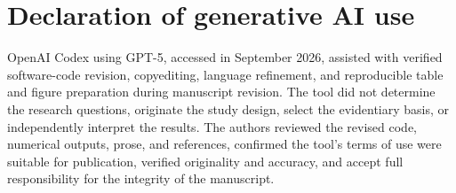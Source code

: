 \documentclass[]{interact}
\begin{document}
\section*{Declaration of generative AI use}

OpenAI Codex using GPT-5, accessed in September 2026, assisted with verified software-code revision, copyediting, language refinement, and reproducible table and figure preparation during manuscript revision. The tool did not determine the research questions, originate the study design, select the evidentiary basis, or independently interpret the results. The authors reviewed the revised code, numerical outputs, prose, and references, confirmed the tool's terms of use were suitable for publication, verified originality and accuracy, and accept full responsibility for the integrity of the manuscript.
\end{document}
